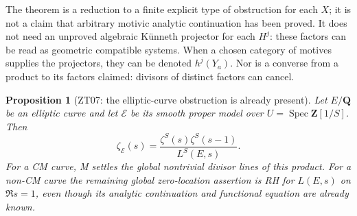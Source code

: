 \documentclass[11pt,a4paper]{article}
\newtheorem{proposition}[theorem]{Proposition}
\theoremstyle{definition}
\begin{document}
The theorem is a reduction to a finite explicit type of obstruction
for each $X$; it is not a claim that arbitrary motivic analytic
continuation has been proved.  It does not need an unproved
algebraic K\"unneth projector for each $H^j$: these factors can be
read as geometric compatible systems.  When a chosen category of
motives supplies the projectors, they can be denoted $h^j(Y_a)$.
Nor is a converse from a product to its factors claimed: divisors
of distinct factors can cancel.

\begin{proposition}[ZT07: the elliptic-curve obstruction is already present]
\label{ZT07}
Let $E/\mathbf Q$ be an elliptic curve and let $\mathcal E$ be its
smooth proper model over $U=\operatorname{Spec}\mathbf Z[1/S]$.
Then
\[
 \zeta_{\mathcal E}(s)=\frac{\zeta^S(s)\zeta^S(s-1)}{L^S(E,s)}.
\]
For a CM curve, M settles the global nontrivial divisor lines of
this product.  For a non-CM curve the remaining global zero-location
assertion is RH for $L(E,s)$ on $\Re s=1$, even though its analytic
continuation and functional equation are already known.
\end{proposition}
\end{document}
